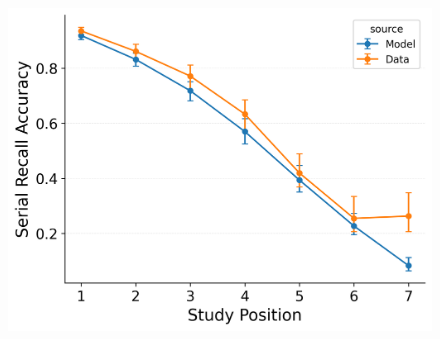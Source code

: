 \documentclass[
  man,
  floatsintext,
  longtable,
  nolmodern,
  notxfonts,
  notimes,
  draftfirst,
  colorlinks=true,linkcolor=blue,citecolor=blue,urlcolor=blue]{apa7}
\begin{document}
\begin{figure}
\begin{minipage}{0.33\linewidth}
\includegraphics{figures/Gordon2021_BaseCMR_Confusable_Fitting_srac_LL7.png}\end{minipage}%

\end{figure}%
\end{document}
